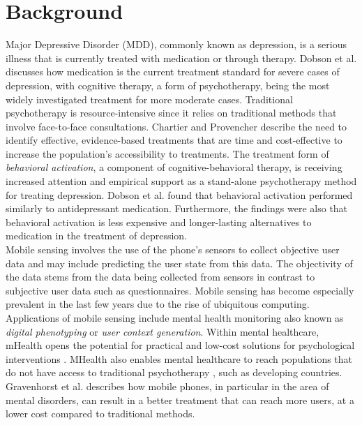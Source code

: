 \section{Background}


Major Depressive Disorder (MDD), commonly known as depression, is a serious illness that is currently treated with medication or through therapy. Dobson et al. \cite{randomized_trial_behavioural_activation} discusses how medication is the current treatment standard for severe cases of depression, with cognitive therapy, a form of psychotherapy, being the most widely investigated treatment for more moderate cases. Traditional psychotherapy is resource-intensive since it relies on traditional methods that involve face-to-face consultations. Chartier and Provencher \cite{behavioural_activation_for_depression} describe the need to identify effective, evidence-based treatments that are time and cost-effective to increase the population's accessibility to treatments. The treatment form of \textit{behavioral activation}, a component of cognitive-behavioral therapy, is receiving increased attention and empirical support as a stand-alone psychotherapy method for treating depression. Dobson et al. found that behavioral activation performed similarly to antidepressant medication. Furthermore, the findings were also that behavioral activation is less expensive and longer-lasting alternatives to medication in the treatment of depression.  \\

Mobile sensing involves the use of the phone's sensors to collect objective user data and may include predicting the user state from this data. The objectivity of the data stems from the data being collected from sensors in contrast to subjective user data such as questionnaires. Mobile sensing has become especially prevalent in the last few years due to the rise of ubiquitous computing. Applications of mobile sensing include mental health monitoring also known as \textit{digital phenotyping} or \textit{user context generation}. Within mental healthcare, mHealth opens the potential for practical and low-cost solutions for psychological interventions \cite{mobile-based-interventions}. MHealth also enables mental healthcare to reach populations that do not have access to traditional psychotherapy \cite{future-mental-health}, such as developing countries. Gravenhorst et al. \cite{Gravenhorst2015} describes how mobile phones, in particular in the area of mental disorders, can result in a better treatment that can reach more users, at a lower cost compared to traditional methods.\\ 

